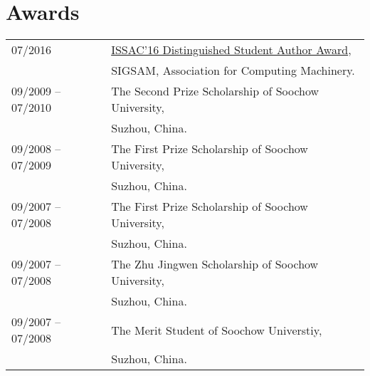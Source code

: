 \documentclass[a4paper,12pt]{article}
\begin{document}
\section*{\Large{Awards}}
\begin{tabular}{@{}p{1.4in}p{4in}}
07/2016               & \href{https://www.sigsam.org/Awards/ISSACAwards.html}{ISSAC'16 Distinguished Student Author Award}, \\
                      & SIGSAM, Association for Computing Machinery. \\
09/2009 -- 07/2010    & The Second Prize Scholarship of Soochow University, \\ 
                      & Suzhou, China.\\
09/2008 -- 07/2009    & The First Prize Scholarship of Soochow University, \\ 
                      & Suzhou, China.\\
09/2007 -- 07/2008    & The First Prize Scholarship of Soochow University, \\ 
                      & Suzhou, China.\\
09/2007 -- 07/2008    & The Zhu Jingwen Scholarship of Soochow University, \\ 
                      & Suzhou, China.\\
09/2007 -- 07/2008    & The Merit Student of Soochow Universtiy, \\ 
                      & Suzhou, China.\\
\end{tabular}

\end{document}
